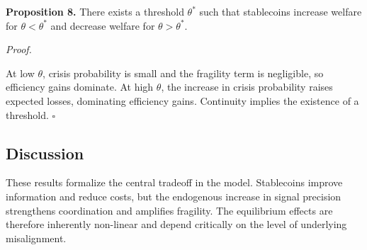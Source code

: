 \textbf{Proposition 8.} There exists a threshold $\theta^*$ such that stablecoins increase welfare for $\theta < \theta^*$ and decrease welfare for $\theta > \theta^*$.

\textit{Proof.}

At low $\theta$, crisis probability is small and the fragility term is negligible, so efficiency gains dominate. At high $\theta$, the increase in crisis probability raises expected losses, dominating efficiency gains. Continuity implies the existence of a threshold. \hfill $\square$

\subsection{Discussion}

These results formalize the central tradeoff in the model. Stablecoins improve information and reduce costs, but the endogenous increase in signal precision strengthens coordination and amplifies fragility. The equilibrium effects are therefore inherently non-linear and depend critically on the level of underlying misalignment.
